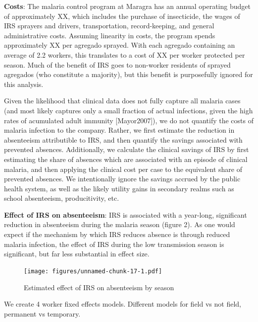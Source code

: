 \documentclass[]{article}
\begin{document}
\textbf{Costs}: The malaria control program at Maragra has an annual
operating budget of approximately XX, which includes the purchase of
insecticide, the wages of IRS sprayers and drivers, transportation,
record-keeping, and general administrative costs. Assuming linearity in
costs, the program spends approximately XX per agregado sprayed. With
each agregado containing an average of 2.2 workers, this translates to a
cost of XX per worker protected per season. Much of the benefit of IRS
goes to non-worker residents of sprayed agregados (who constitute a
majority), but this benefit is purposefully ignored for this analysis.

Given the likelihood that clinical data does not fully capture all
malaria cases (and most likely captures only a small fraction of actual
infections, given the high rates of acumulated adult immunity
{[}Mayor2007{]}), we do not quantify the costs of malaria infection to
the company. Rather, we first estimate the reduction in absenteeism
attributible to IRS, and then quantify the savings associated with
prevented absences. Additionally, we calculate the clinical savings of
IRS by first estimating the share of absences which are associated with
an episode of clinical malaria, and then applying the clinical cost per
case to the equivalent share of prevented absences. We intentionally
ignore the savings accrued by the public health system, as well as the
likely utility gains in secondary realms such as school absenteeism,
producitivity, etc.

\textbf{Effect of IRS on absenteeism}: IRS is associated with a
year-long, significant reduction in absenteeism during the malaria
season (figure 2). As one would expect if the mechanism by which IRS
reduces absence is through reduced malaria infection, the effect of IRS
during the low transmission season is significant, but far less
substantial in effect size.

\begin{figure}
\centering
\texttt{[image: figures/unnamed-chunk-17-1.pdf]}
\caption{Estimated effect of IRS on absenteeism by season}
\end{figure}

We create 4 worker fixed effects models. Different models for field vs
not field, permanent vs temporary.
\end{document}
